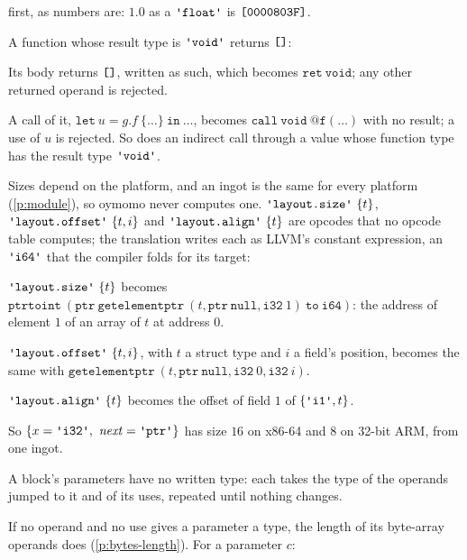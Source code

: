 \documentclass[11pt,letterpaper]{article}
\newcommand{\kw}[1]{\mathtt{#1}}
\newcommand{\str}[1]{\text{\ttfamily\textquotesingle #1\textquotesingle}}  %
\newcommand{\hex}[1]{\text{\ttfamily [#1]}}  %
\newcounter{pt}
\newcommand{\pref}[1]{\ref{#1}}  %
\begin{document}
\begin{points}
\begin{subpoints}
    first, as numbers are: $1.0$ as a $\str{float}$ is $\hex{0000803F}$.
  \end{subpoints}
\item\label{p:void} A function whose result type is $\str{void}$ returns $\hex{}$:
  \begin{subpoints}
  \item Its body returns $\hex{}$, written as such, which becomes $\kw{ret\ void}$; any other returned operand is rejected.
  \item A call of it, $\kw{let}\ u = g.f\ \{\dots\}\ \kw{in}\ \dots$, becomes $\kw{call\ void\ @f(\dots)}$ with no result; a use of $u$ is rejected.
    So does an indirect call through a value whose function type has the result type $\str{void}$.
  \end{subpoints}
\item\label{p:sizes}Sizes depend on the platform, and an ingot is the same for every platform (\pref{p:module}), so
  oymomo never computes one. $\str{layout.size}\ \{t\}$, $\str{layout.offset}\ \{t, i\}$ and $\str{layout.align}\ \{t\}$
  are opcodes that no opcode table computes; the translation writes each as LLVM's constant expression, an
  $\str{i64}$ that the compiler folds for its target:
  \begin{subpoints}
  \item $\str{layout.size}\ \{t\}$ becomes $\kw{ptrtoint}\ (\kw{ptr\ getelementptr}\ (t, \kw{ptr\ null}, \kw{i32}\ 1)\ \kw{to\ i64})$:
    the address of element $1$ of an array of $t$ at address $0$.
  \item $\str{layout.offset}\ \{t, i\}$, with $t$ a struct type and $i$ a field's position, becomes the same with
    $\kw{getelementptr}\ (t, \kw{ptr\ null}, \kw{i32}\ 0, \kw{i32}\ i)$.
  \item $\str{layout.align}\ \{t\}$ becomes the offset of field $1$ of $\{\str{i1}, t\}$.
  \item So $\{x = \str{i32},\ \mathit{next} = \str{ptr}\}$ has size $16$ on x86-64 and $8$ on 32-bit ARM, from one ingot.
  \end{subpoints}
\item\label{p:infer} A block's parameters have no written type: each takes the type of the operands
  jumped to it and of its uses, repeated until nothing changes.
  \begin{subpoints}
  \item If no operand and no use gives a parameter a type, the length of its byte-array operands does
    (\pref{p:bytes-length}). For a parameter $c$:
    \begin{itemize}

\end{itemize}
\end{subpoints}
\end{points}
\end{document}
